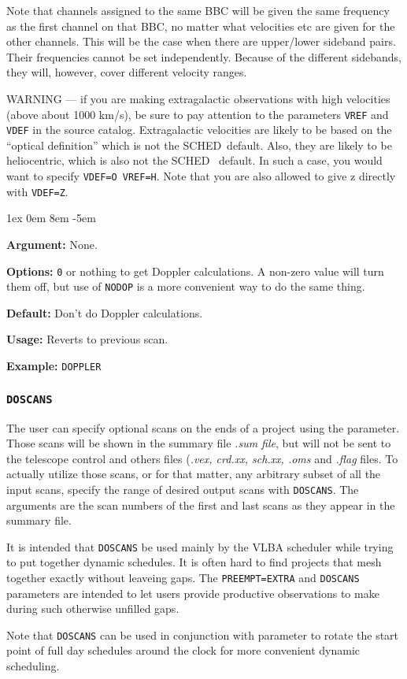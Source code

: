 \documentclass{report}
\newcommand{\schedb}{{\sc SCHED~}}
\newcommand{\rcwbox}[5]{
  \begin{list}{}{\parsep 1ex  \itemsep 0em
                 \leftmargin 8em  \itemindent -5em }
    \item {\bf Argument:} #1
    \item {\bf Options:}  #2
    \item {\bf Default:}  #3
    \item {\bf Usage:}    #4
    \item {\bf Example:}  #5
  \end{list}
}
\begin{document}
Note that channels assigned to the same BBC will be given the same
frequency as the first channel on that BBC, no matter what velocities
etc are given for the other channels.  This will be the case when
there are upper/lower sideband pairs.  Their frequencies cannot
be set independently.  Because of the different sidebands, they
will, however, cover different velocity ranges.

WARNING --- if you are making extragalactic observations with high
velocities (above about 1000 km/s), be sure to pay attention to the
parameters {\tt VREF} and {\tt VDEF} in the source catalog.
Extragalactic velocities are likely to be based on the ``optical
definition'' which is not the \schedb default.  Also, they are likely
to be heliocentric, which is also not the \schedb
default.  In such a case, you would want to specify {\tt VDEF=O
VREF=H}.  Note that you are also allowed to give z directly with
{\tt VDEF=Z}.

\rcwbox
{None.}
{{\tt 0} or nothing to get Doppler calculations. A non-zero value will
turn them off, but use of {\tt NODOP} is a more convenient way to
do the same thing.}
{Don't do Doppler calculations.}
{Reverts to previous scan.}
{{\tt DOPPLER}}

\subsubsection{\label{MP:DOSCANS}{\tt DOSCANS}}

The user can specify optional scans on the ends of a project using
the  parameter.  Those scans will
be shown in the summary file {\sl .sum file}, but will not be sent 
to the telescope control and others files ({\sl .vex, crd.xx, sch.xx,
.oms} and {\sl .flag} files.  To actually utilize those scans, or for
that matter, any arbitrary subset of all the input scans, specify
the range of desired output scans with {\tt DOSCANS}.  The arguments
are the scan numbers of the first and last scans as they appear in 
the summary file.  

It is intended that {\tt DOSCANS} be used mainly by the VLBA scheduler
while trying to put together dynamic schedules.  It is often hard to
find projects that mesh together exactly without leaveing gaps.  The
{\tt PREEMPT=EXTRA} and {\tt DOSCANS} parameters are intended to let
users provide productive observations to make during such otherwise
unfilled gaps.

Note that {\tt DOSCANS} can be used in conjunction with parameter
 to rotate the start point of
full day schedules around the clock for more convenient dynamic
scheduling.
\end{document}
